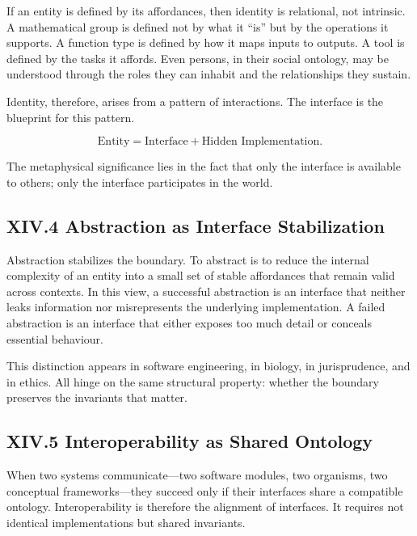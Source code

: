 \documentclass[11pt,letterpaper]{article}
\begin{document}
If an entity is defined by its affordances, then identity is relational, not intrinsic. A mathematical group is defined not by what it ``is'' but by the operations it supports. A function type is defined by how it maps inputs to outputs. A tool is defined by the tasks it affords. Even persons, in their social ontology, may be understood through the roles they can inhabit and the relationships they sustain.

Identity, therefore, arises from a pattern of interactions. The interface is the blueprint for this pattern.

\[
\text{Entity} = \text{Interface} + \text{Hidden Implementation}.
\]

The metaphysical significance lies in the fact that only the interface is available to others; only the interface participates in the world.

\subsection{XIV.4 Abstraction as Interface Stabilization}

Abstraction stabilizes the boundary. To abstract is to reduce the internal complexity of an entity into a small set of stable affordances that remain valid across contexts. In this view, a successful abstraction is an interface that neither leaks information nor misrepresents the underlying implementation. A failed abstraction is an interface that either exposes too much detail or conceals essential behaviour.

This distinction appears in software engineering, in biology, in jurisprudence, and in ethics. All hinge on the same structural property: whether the boundary preserves the invariants that matter.

\subsection{XIV.5 Interoperability as Shared Ontology}

When two systems communicate—two software modules, two organisms, two conceptual frameworks—they succeed only if their interfaces share a compatible ontology. Interoperability is therefore the alignment of interfaces. It requires not identical implementations but shared invariants.
\end{document}
